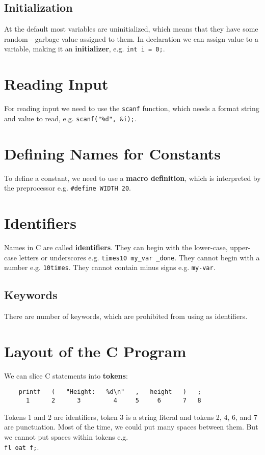 \documentclass[openany]{book}
\begin{document}
    \subsection*{Initialization}
    At the default most variables are uninitialized, which means that they have some random - garbage value assigned to them. In declaration we can assign value to a variable, making it an \textbf{initializer}, e.g. \texttt{int i = 0;}.

    \section{Reading Input}
    For reading input we need to use the \texttt{scanf} function, which needs a format string and value to read, e.g. \texttt{scanf("\%d", \&i);}.

    \section{Defining Names for Constants}
    To define a constant, we need to use a \textbf{macro definition}, which is interpreted by the preprocessor e.g. \texttt{\#define WIDTH 20}.

    \section{Identifiers}
    Names in C are called \textbf{identifiers}. They can begin with the lower-case, upper-case letters or underscores e.g. \texttt{times10  my\_var  \_done}. They cannot begin with a number e.g. \texttt{10times}. They cannot contain minus signs e.g. \texttt{my-var}.

    \subsection*{Keywords}
    There are number of keywords, which are prohibited from using as identifiers.

    \section{Layout of the C Program}
    We can slice C statements into \textbf{tokens}:
    \begin{lstlisting}
    printf   (   "Height:   %d\n"   ,   height   )   ;
      1      2      3         4     5     6      7   8
    \end{lstlisting}
    Tokens 1 and 2 are identifiers, token 3 is a string literal and tokens 2, 4, 6, and 7 are punctuation. Most of the time, we could put many spaces between them. But we cannot put spaces within tokens e.g. \\
    \texttt{fl oat f;}. 
\end{document}
